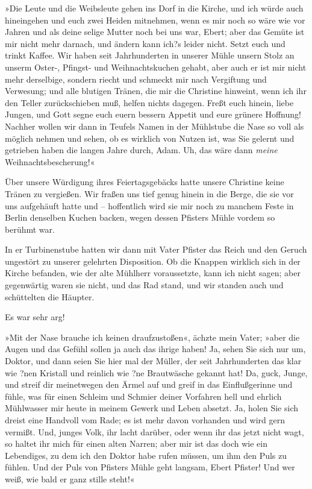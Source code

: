 »Die Leute und die Weibsleute gehen ins Dorf in die Kirche, und ich
würde auch hineingehen und euch zwei Heiden mitnehmen, wenn es mir
noch so wäre wie vor Jahren und als deine selige Mutter noch bei
uns war, Ebert; aber das Gemüte ist mir nicht mehr darnach, und
ändern kann ich?s leider nicht. Setzt euch und trinkt Kaffee. Wir
haben seit Jahrhunderten in unserer Mühle unsern Stolz an unserm
Oster-, Pfingst- und Weihnachtskuchen gehabt, aber auch er ist mir
nicht mehr derselbige, sondern riecht und schmeckt mir nach
Vergiftung und Verwesung; und alle blutigen Tränen, die mir die
Christine hinweint, wenn ich ihr den Teller zurückschieben muß,
helfen nichts dagegen. Freßt euch hinein, liebe Jungen, und Gott
segne euch euern bessern Appetit und eure grünere Hoffnung! Nachher
wollen wir dann in Teufels Namen in der Mühlstube die Nase so voll
als möglich nehmen und sehen, ob es wirklich von Nutzen ist, was
Sie gelernt und getrieben haben die langen Jahre durch, Adam. Uh,
das wäre dann \emph{meine} Weihnachtsbescherung!«

Über unsere Würdigung ihres Feiertagsgebäcks hatte unsere Christine
keine Tränen zu vergießen. Wir fraßen uns tief genug hinein in die
Berge, die sie vor uns aufgehäuft hatte und – hoffentlich wird sie
mir noch zu manchem Feste in Berlin denselben Kuchen backen, wegen
dessen Pfisters Mühle vordem so berühmt war.

In er Turbinenstube hatten wir dann mit Vater Pfister das Reich und
den Geruch ungestört zu unserer gelehrten Disposition. Ob die
Knappen wirklich sich in der Kirche befanden, wie der alte Mühlherr
voraussetzte, kann ich nicht sagen; aber gegenwärtig waren sie
nicht, und das Rad stand, und wir standen auch und schüttelten die
Häupter.

Es war sehr arg!

»Mit der Nase brauche ich keinen draufzustoßen«, ächzte mein Vater;
»aber die Augen und das Gefühl sollen ja auch das ihrige haben! Ja,
sehen Sie sich nur um, Doktor, und dann seien Sie hier mal der
Müller, der seit Jahrhunderten das klar wie ?nen Kristall und
reinlich wie ?ne Brautwäsche gekannt hat! Da, guck, Junge, und
streif dir meinetwegen den Ärmel auf und greif in das
Einflußgerinne und fühle, was für einen Schleim und Schmier deiner
Vorfahren hell und ehrlich Mühlwasser mir heute in meinem Gewerk
und Leben absetzt. Ja, holen Sie sich dreist eine Handvoll vom
Rade; es ist mehr davon vorhanden und wird gern vermißt. Und,
junges Volk, ihr lacht darüber, oder wenn ihr das jetzt nicht wagt,
so haltet ihr mich für einen alten Narren; aber mir ist das doch
wie ein Lebendiges, zu dem ich den Doktor habe rufen müssen, um ihm
den Puls zu fühlen. Und der Puls von Pfisters Mühle geht langsam,
Ebert Pfister! Und wer weiß, wie bald er ganz stille steht!«

